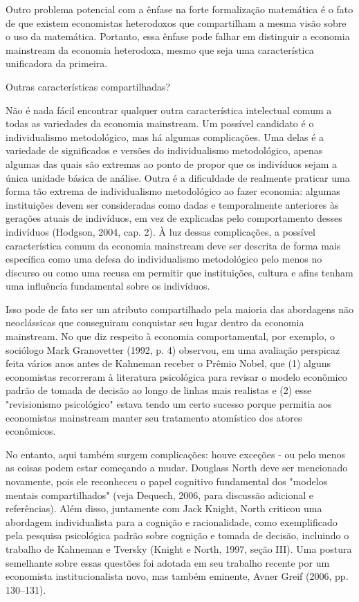 \documentclass[a4paper,12pt]{article}[abntex2]
\begin{document}
Outro problema potencial com a ênfase na forte formalização matemática é o fato de que existem economistas heterodoxos que compartilham a mesma visão sobre o uso da matemática. Portanto, essa ênfase pode falhar em distinguir a economia mainstream da economia heterodoxa, mesmo que seja uma característica unificadora da primeira.

Outras características compartilhadas?

Não é nada fácil encontrar qualquer outra característica intelectual comum a todas as variedades da economia mainstream. Um possível candidato é o individualismo metodológico, mas há algumas complicações. Uma delas é a variedade de significados e versões do individualismo metodológico, apenas algumas das quais são extremas ao ponto de propor que os indivíduos sejam a única unidade básica de análise. Outra é a dificuldade de realmente praticar uma forma tão extrema de individualismo metodológico ao fazer economia: algumas instituições devem ser consideradas como dadas e temporalmente anteriores às gerações atuais de indivíduos, em vez de explicadas pelo comportamento desses indivíduos (Hodgson, 2004, cap. 2). À luz dessas complicações, a possível característica comum da economia mainstream deve ser descrita de forma mais específica como uma defesa do individualismo metodológico pelo menos no discurso ou como uma recusa em permitir que instituições, cultura e afins tenham uma influência fundamental sobre os indivíduos.

Isso pode de fato ser um atributo compartilhado pela maioria das abordagens não neoclássicas que conseguiram conquistar seu lugar dentro da economia mainstream. No que diz respeito à economia comportamental, por exemplo, o sociólogo Mark Granovetter (1992, p. 4) observou, em uma avaliação perspicaz feita vários anos antes de Kahneman receber o Prêmio Nobel, que (1) alguns economistas recorreram à literatura psicológica para revisar o modelo econômico padrão de tomada de decisão ao longo de linhas mais realistas e (2) esse "revisionismo psicológico" estava tendo um certo sucesso porque permitia aos economistas mainstream manter seu tratamento atomístico dos atores econômicos.

No entanto, aqui também surgem complicações: houve exceções - ou pelo menos as coisas podem estar começando a mudar. Douglass North deve ser mencionado novamente, pois ele reconheceu o papel cognitivo fundamental dos "modelos mentais compartilhados" (veja Dequech, 2006, para discussão adicional e referências). Além disso, juntamente com Jack Knight, North criticou uma abordagem individualista para a cognição e racionalidade, como exemplificado pela pesquisa psicológica padrão sobre cognição e tomada de decisão, incluindo o trabalho de Kahneman e Tversky (Knight e North, 1997, seção III). Uma postura semelhante sobre essas questões foi adotada em seu trabalho recente por um economista institucionalista novo, mas também eminente, Avner Greif (2006, pp. 130–131).
\end{document}
